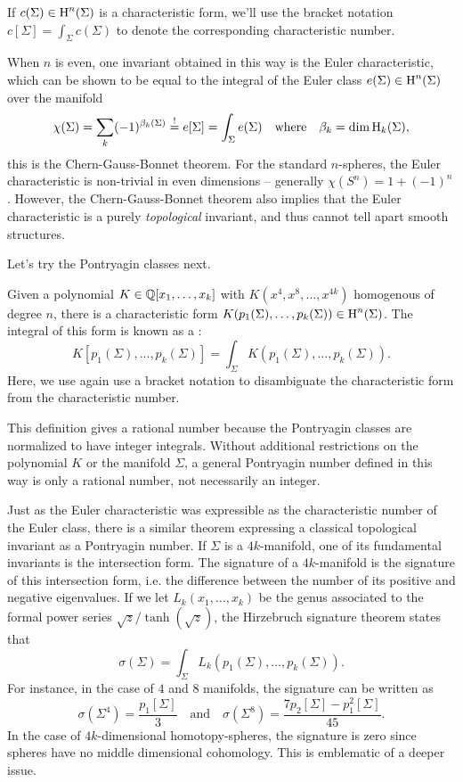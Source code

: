 \begin{convention*}
	If $c(\Sigma)\in \operatorname{H}^n(\Sigma)$ is a characteristic form, we'll use the bracket notation $c[\Sigma]=\int_\Sigma c(\Sigma)$ to denote the corresponding characteristic number.
\end{convention*}

When $n$ is even, one invariant obtained in this way is the Euler characteristic, which can be shown to be equal to the integral of the Euler class $e(\Sigma)\in \operatorname{H}^n(\Sigma)$ over the manifold
\[
	\chi(\Sigma) = \sum_k (-1)^{\beta_k(\Sigma)} \overset{!}{=} e[\Sigma] = \int_\Sigma e(\Sigma)\quad\textrm{where}\quad \beta_k = \dim \operatorname{H}_k(\Sigma),
\]
this is the Chern-Gauss-Bonnet theorem. For the standard $n$-spheres, the Euler characteristic is non-trivial in even dimensions -- generally $\chi(S^n)=1+(-1)^n$. However, the Chern-Gauss-Bonnet theorem also implies that the Euler characteristic is a purely \emph{topological} invariant, and thus cannot tell apart smooth structures.

Let's try the Pontryagin classes next.

\begin{definition}\label{defn:pontryagin_number}
	Given a polynomial $K\in \mathbb{Q}[x_1,\ldots, x_k]$ with $K(x^4, x^8,\ldots, x^{4k})$ homogenous of degree $n$, there is a characteristic form $K(p_1(\Sigma), \ldots, p_k(\Sigma)) \in \operatorname{H}^n(\Sigma)$. The integral of this form is known as a
	:
	\[
		K[p_1(\Sigma), \ldots, p_k(\Sigma)] = \int_{\Sigma} K(p_1(\Sigma), \ldots, p_k(\Sigma)).
	\]
	Here, we use again use a bracket notation to disambiguate the characteristic form from the characteristic number.
\end{definition}

\begin{remark}
	This definition gives a rational number because the Pontryagin classes are normalized to have integer integrals. Without additional restrictions on the polynomial $K$ or the manifold $\Sigma$, a general Pontryagin number defined in this way is only a rational number, not necessarily an integer.
\end{remark}

Just as the Euler characteristic was expressible as the characteristic number of the Euler class, there is a similar theorem expressing a classical topological invariant as a Pontryagin number. If $\Sigma$ is a $4k$-manifold, one of its fundamental invariants is the intersection form. The signature of a $4k$-manifold is the signature of this intersection form, i.e. the difference between the number of its positive and negative eigenvalues. If we let $L_k(x_1,\ldots, x_k)$ be the genus associated to the formal power series $\sqrt{z}/\tanh(\sqrt{z})$, the Hirzebruch signature theorem states that
\[
	\sigma(\Sigma) = \int_\Sigma L_k(p_1(\Sigma),\ldots, p_k(\Sigma)).
\]
For instance, in the case of $4$ and $8$ manifolds, the signature can be written as
\[
	\sigma(\Sigma^4) = \frac{p_1[\Sigma]}{3}
	\quad\textrm{and}\quad
	\sigma(\Sigma^8) = \frac{7p_2[\Sigma] - p_1^2[\Sigma]}{45}.
\]
In the case of $4k$-dimensional homotopy-spheres, the signature is zero since spheres have no middle dimensional cohomology. This is emblematic of a deeper issue.

